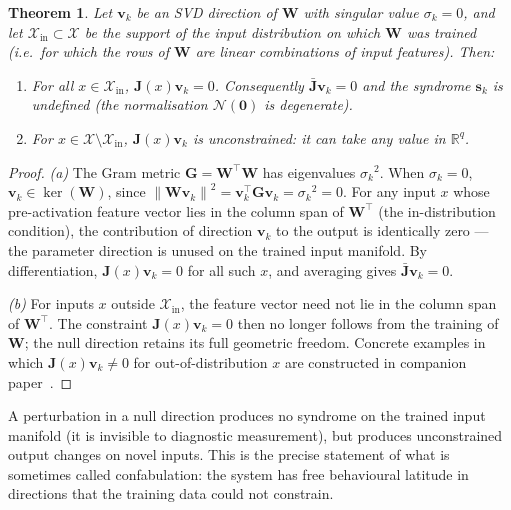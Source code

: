 \documentclass[11pt,a4paper]{article}
\newtheorem{theorem}{Theorem}[section]
\theoremstyle{definition}
\newcommand{\Wm}{\mathbf{W}}
\newcommand{\Gm}{\mathbf{G}}
\newcommand{\Jm}{\mathbf{J}}
\newcommand{\vk}[1][]{\mathbf{v}_{#1}}
\newcommand{\sk}[1][]{\mathbf{s}_{#1}}
\newcommand{\Rbb}{\mathbb{R}}
\newcommand{\Nop}{\mathcal{N}}
\newcommand{\norm}[1]{\left\lVert#1\right\rVert}
\begin{document}
\begin{thmbox}
\begin{theorem}
\label{thm:null}
Let $\vk[k]$ be an SVD direction of $\Wm$ with singular value $\sigma_k = 0$, and let $\mathcal{X}_{\mathrm{in}}\subset\mathcal{X}$ be the support of the input distribution on which $\Wm$ was trained (i.e.\ for which the rows of $\Wm$ are linear combinations of input features). Then:
\begin{enumerate}[label=(\alph*),nosep]
  \item For all $x\in\mathcal{X}_{\mathrm{in}}$, $\Jm(x)\vk[k] = 0$. Consequently $\bar{\Jm}\vk[k] = 0$ and the syndrome $\sk[k]$ is undefined (the normalisation $\Nop(\mathbf{0})$ is degenerate).
  \item For $x\in\mathcal{X}\setminus\mathcal{X}_{\mathrm{in}}$, $\Jm(x)\vk[k]$ is unconstrained: it can take any value in $\Rbb^q$.
\end{enumerate}
\end{theorem}
\end{thmbox}

\begin{proof}
\emph{(a)} The Gram metric $\Gm = \Wm^\top\Wm$ has eigenvalues $\sigma_k{}^2$. When $\sigma_k = 0$, $\vk[k] \in \ker(\Wm)$, since $\norm{\Wm\vk[k]}^2 = \vk[k]^\top\Gm\vk[k] = \sigma_k{}^2 = 0$. For any input $x$ whose pre-activation feature vector lies in the column span of $\Wm^\top$ (the in-distribution condition), the contribution of direction $\vk[k]$ to the output is identically zero --- the parameter direction is unused on the trained input manifold. By differentiation, $\Jm(x)\vk[k] = 0$ for all such $x$, and averaging gives $\bar{\Jm}\vk[k] = 0$.

\emph{(b)} For inputs $x$ outside $\mathcal{X}_{\mathrm{in}}$, the feature vector need not lie in the column span of $\Wm^\top$. The constraint $\Jm(x)\vk[k] = 0$ then no longer follows from the training of $\Wm$; the null direction retains its full geometric freedom. Concrete examples in which $\Jm(x)\vk[k]\neq 0$ for out-of-distribution $x$ are constructed in companion paper~\cite{ThreeModesLLM}.
\end{proof}

\begin{notebox}[Interpretation]
A perturbation in a null direction produces no syndrome on the trained input manifold (it is invisible to diagnostic measurement), but produces unconstrained output changes on novel inputs. This is the precise statement of what is sometimes called confabulation: the system has free behavioural latitude in directions that the training data could not constrain.
\end{notebox}
\end{document}
